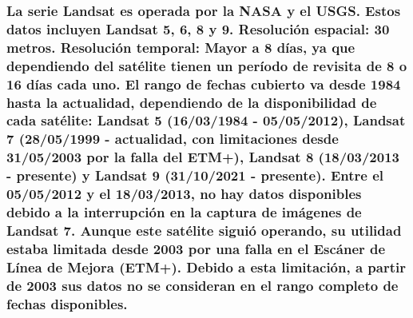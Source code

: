 \documentclass[
]{book}
\begin{document}
\subsubsection{\texorpdfstring{La serie \textbf{Landsat} es operada por la NASA y el USGS. Estos datos incluyen Landsat 5, 6, 8 y 9. \textbf{Resolución espacial:} 30 metros. \textbf{Resolución temporal:} Mayor a 8 días, ya que dependiendo del satélite tienen un período de revisita de 8 o 16 días cada uno. El \textbf{rango de fechas} cubierto va desde \textbf{1984 hasta la actualidad}, dependiendo de la disponibilidad de cada satélite: \textbf{Landsat 5} (16/03/1984 - 05/05/2012), \textbf{Landsat 7} (28/05/1999 - actualidad, con limitaciones desde 31/05/2003 por la falla del ETM+), \textbf{Landsat 8} (18/03/2013 - presente) y \textbf{Landsat 9} (31/10/2021 - presente). Entre el \textbf{05/05/2012 y el 18/03/2013}, no hay datos disponibles debido a la interrupción en la captura de imágenes de Landsat 7. Aunque este satélite siguió operando, su utilidad estaba limitada desde 2003 por una falla en el Escáner de Línea de Mejora (ETM+). Debido a esta limitación, a partir de 2003 sus datos no se consideran en el rango completo de fechas disponibles.}{La serie Landsat es operada por la NASA y el USGS. Estos datos incluyen Landsat 5, 6, 8 y 9. Resolución espacial: 30 metros. Resolución temporal: Mayor a 8 días, ya que dependiendo del satélite tienen un período de revisita de 8 o 16 días cada uno. El rango de fechas cubierto va desde 1984 hasta la actualidad, dependiendo de la disponibilidad de cada satélite: Landsat 5 (16/03/1984 - 05/05/2012), Landsat 7 (28/05/1999 - actualidad, con limitaciones desde 31/05/2003 por la falla del ETM+), Landsat 8 (18/03/2013 - presente) y Landsat 9 (31/10/2021 - presente). Entre el 05/05/2012 y el 18/03/2013, no hay datos disponibles debido a la interrupción en la captura de imágenes de Landsat 7. Aunque este satélite siguió operando, su utilidad estaba limitada desde 2003 por una falla en el Escáner de Línea de Mejora (ETM+). Debido a esta limitación, a partir de 2003 sus datos no se consideran en el rango completo de fechas disponibles.}}\label{la-serie-landsat-es-operada-por-la-nasa-y-el-usgs.-estos-datos-incluyen-landsat-5-6-8-y-9.-resoluciuxf3n-espacial-30-metros.-resoluciuxf3n-temporal-mayor-a-8-duxedas-ya-que-dependiendo-del-satuxe9lite-tienen-un-peruxedodo-de-revisita-de-8-o-16-duxedas-cada-uno.-el-rango-de-fechas-cubierto-va-desde-1984-hasta-la-actualidad-dependiendo-de-la-disponibilidad-de-cada-satuxe9lite-landsat-5-16031984---05052012-landsat-7-28051999---actualidad-con-limitaciones-desde-31052003-por-la-falla-del-etm-landsat-8-18032013---presente-y-landsat-9-31102021---presente.-entre-el-05052012-y-el-18032013-no-hay-datos-disponibles-debido-a-la-interrupciuxf3n-en-la-captura-de-imuxe1genes-de-landsat-7.-aunque-este-satuxe9lite-siguiuxf3-operando-su-utilidad-estaba-limitada-desde-2003-por-una-falla-en-el-escuxe1ner-de-luxednea-de-mejora-etm.-debido-a-esta-limitaciuxf3n-a-partir-de-2003-sus-datos-no-se-consideran-en-el-rango-completo-de-fechas-disponibles.}
\end{document}
